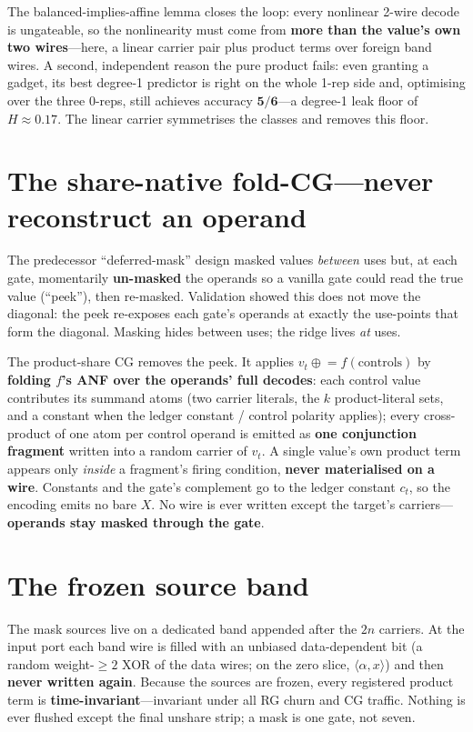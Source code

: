 \documentclass[11pt]{article}
\newcommand{\xor}{\oplus}
\begin{document}
The balanced-implies-affine lemma closes the loop: every nonlinear 2-wire decode
is ungateable, so the nonlinearity must come from \textbf{more than the value's
own two wires}---here, a linear carrier pair plus product terms over foreign band
wires. A second, independent reason the pure product fails: even granting a
gadget, its best degree-1 predictor is right on the whole 1-rep side and,
optimising over the three 0-reps, still achieves accuracy $\mathbf{5/6}$---a
degree-1 leak floor of $H\approx0.17$. The linear carrier symmetrises the classes
and removes this floor.

\section{The share-native fold-CG---never reconstruct an operand}

The predecessor ``deferred-mask'' design masked values \emph{between} uses but,
at each gate, momentarily \textbf{un-masked} the operands so a vanilla gate could
read the true value (``peek''), then re-masked. Validation showed this does not
move the diagonal: the peek re-exposes each gate's operands at exactly the
use-points that form the diagonal. Masking hides between uses; the ridge lives
\emph{at} uses.

The product-share CG removes the peek. It applies $v_t \mathrel{\xor}= f(\text{controls})$
by \textbf{folding $f$'s ANF over the operands' full decodes}: each control value
contributes its summand atoms (two carrier literals, the $k$ product-literal
sets, and a constant when the ledger constant / control polarity applies); every
cross-product of one atom per control operand is emitted as \textbf{one
conjunction fragment} written into a random carrier of $v_t$. A single value's
own product term appears only \emph{inside} a fragment's firing condition,
\textbf{never materialised on a wire}. Constants and the gate's complement go to
the ledger constant $c_t$, so the encoding emits no bare $X$. No wire is ever
written except the target's carriers---\textbf{operands stay masked through the
gate}.

\section{The frozen source band}

The mask sources live on a dedicated band appended after the $2n$ carriers. At
the input port each band wire is filled with an unbiased data-dependent bit (a
random weight-$\ge2$ XOR of the data wires; on the zero slice, $\langle\alpha,x
\rangle$) and then \textbf{never written again}. Because the sources are frozen,
every registered product term is \textbf{time-invariant}---invariant under all RG
churn and CG traffic. Nothing is ever flushed except the final unshare strip; a
mask is one gate, not seven.
\end{document}
